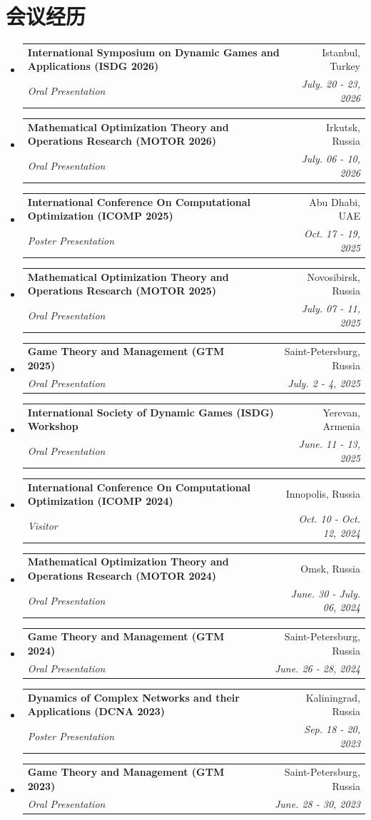 \documentclass[letterpaper,10pt,fontset=none]{ctexart}
\makeatletter
\newcommand{\resumeSubheading}[4]{
  \vspace{-2pt}\item
  \begin{tabular*}{0.97\textwidth}[t]{l@{\extracolsep{\fill}}r}
    \textbf{#1} & #2 \\
    \textit{\small#3} & \textit{\small #4} \\
  \end{tabular*}\vspace{-7pt}
}
\newenvironment{resumeSubHeadingList}{\begin{itemize}[leftmargin=0.15in, label={}]}{\end{itemize}}
\makeatother
\begin{document}
\section{会议经历}
\begin{resumeSubHeadingList}
  \resumeSubheading{\nth{21} International Symposium on Dynamic Games and Applications (ISDG 2026)}{Istanbul, Turkey}{Oral Presentation}{July. 20 - 23, 2026}
  \resumeSubheading{Mathematical Optimization Theory and Operations Research
                    (MOTOR 2026)}{Irkutsk, Russia}{Oral Presentation}{July. 06
                    - 10, 2026}
  \resumeSubheading{International Conference On Computational Optimization
                    (ICOMP 2025)}{Abu Dhabi, UAE}{Poster Presentation}{Oct. 17
                    - 19, 2025}
  \resumeSubheading{Mathematical Optimization Theory and Operations Research
                    (MOTOR 2025)}{Novosibirsk, Russia}{Oral Presentation}{July.
                    07 - 11, 2025}
  \resumeSubheading{Game Theory and Management (GTM 2025)}{Saint-Petersburg,
                    Russia}{Oral Presentation}{July. 2 - 4, 2025}
  \resumeSubheading{\nth{14} International Society of Dynamic Games (ISDG) Workshop}{Yerevan, Armenia}{Oral Presentation}{June. 11 - 13, 2025}
  \resumeSubheading{International Conference On Computational Optimization
                    (ICOMP 2024)}{Innopolis, Russia}{Visitor}{Oct. 10 - Oct.
                    12, 2024}
  \resumeSubheading{Mathematical Optimization Theory and Operations Research
                    (MOTOR 2024)}{Omsk, Russia}{Oral Presentation}{June. 30 -
                    July. 06, 2024}
  \resumeSubheading{Game Theory and Management (GTM 2024)}{Saint-Petersburg,
                    Russia}{Oral Presentation}{June. 26 - 28, 2024}
  \resumeSubheading{Dynamics of Complex Networks and their Applications (DCNA
                    2023)}{Kaliningrad, Russia}{Poster Presentation}{Sep. 18 -
                    20, 2023}
  \resumeSubheading{Game Theory and Management (GTM 2023)}{Saint-Petersburg,
                    Russia}{Oral Presentation}{June. 28 - 30, 2023}
\end{resumeSubHeadingList}
\end{document}
